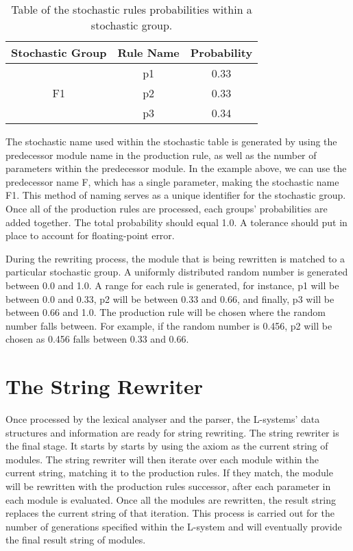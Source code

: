 \begin{table}[h!] \center
\begin{tabular}{ | c | c | c | }
\hline
	Stochastic Group & Rule Name & Probability\\  
\hline
\hline
\multirow{3}{*}{F1} & p1 & 0.33 \\
& p2 & 0.33 \\
& p3 & 0.34 \\
\hline
\end{tabular}
\caption{Table of the stochastic rules probabilities within a stochastic group.}
\label{stochastic table}
\end{table}
\FloatBarrier

The stochastic name used within the stochastic table is generated by using the predecessor module name in the production rule, as well as the number of parameters within the predecessor module. In the example above, we can use the predecessor name F, which has a single parameter, making the stochastic name F1. This method of naming serves as a unique identifier for the stochastic group. Once all of the production rules are processed, each groups' probabilities are added together. The total probability should equal 1.0. A tolerance should put in place to account for floating-point error.

During the rewriting process, the module that is being rewritten is matched to a particular stochastic group. A uniformly distributed random number is generated between 0.0 and 1.0. A range for each rule is generated, for instance, p1 will be between 0.0 and 0.33, p2 will be between 0.33 and 0.66, and finally, p3 will be between 0.66 and 1.0. The production rule will be chosen where the random number falls between. For example, if the random number is 0.456, p2 will be chosen as 0.456 falls between 0.33 and 0.66.

\section{The String Rewriter}

Once processed by the lexical analyser and the parser, the L-systems' data structures and information are ready for string rewriting. The string rewriter is the final stage. It starts by starts by using the axiom as the current string of modules. The string rewriter will then iterate over each module within the current string, matching it to the production rules. If they match, the module will be rewritten with the production rules successor, after each parameter in each module is evaluated. Once all the modules are rewritten, the result string replaces the current string of that iteration. This process is carried out for the number of generations specified within the L-system and will eventually provide the final result string of modules.

